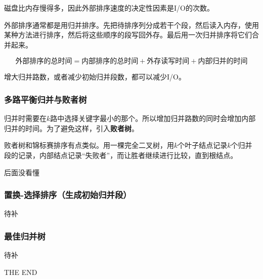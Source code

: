 \documentclass[12pt, a4paper, oneside]{ctexart}
\begin{document}
磁盘比内存慢得多，因此外部排序速度的决定性因素是I/O的次数。

外部排序通常都是用归并排序。先把待排序列分成若干个段，然后读入内存，使用某种方法进行排序，然后将这些顺序的段写回外存。最后用一次归并排序将它们合并起来。

\begin{equation*}
  \text{外部排序的总时间}=\text{内部排序的总时间}+\text{外存读写时间}+\text{内部归并的时间}
\end{equation*}

增大归并路数，或者减少初始归并段数，都可以减少I/O。

\subsubsection{多路平衡归并与败者树}

归并时需要在$k$路中选择关键字最小的那个。所以增加归并路数的同时会增加内部归并的时间。为了避免这样，引入\textbf{败者树}。

败者树和锦标赛排序有点类似。用一棵完全二叉树，用$k$个叶子结点记录$k$个归并段的记录，内部结点记录“失败者”，而让胜者继续进行比较，直到根结点。

后面没看懂

\subsubsection{置换-选择排序（生成初始归并段）}

待补

\subsubsection{最佳归并树}

待补

\vspace*{30pt}

\begin{center}
  \Large{THE END}
\end{center}
\end{document}
